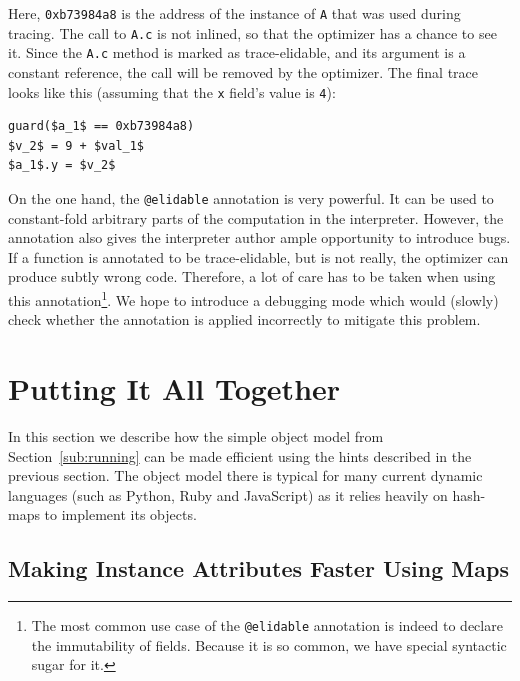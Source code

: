\documentclass[preprint]{sigplanconf}
\newcommand{\noop}{}
\begin{document}
Here, \texttt{0xb73984a8} is the address of the instance of \texttt{A} that was used
during tracing. The call to \texttt{A.c} is not inlined, so that the optimizer
has a chance to see it. Since the \texttt{A.c} method is marked as trace-elidable, and its
argument
is a constant reference, the call will be removed by the optimizer. The final
trace looks like this (assuming that the \texttt{x} field's value is \texttt{4}):
%
{\noop
\begin{lstlisting}[mathescape,basicstyle=\ttfamily]
guard($a_1$ == 0xb73984a8)
$v_2$ = 9 + $val_1$
$a_1$.y = $v_2$
\end{lstlisting}
}

On the one hand, the \texttt{@elidable} annotation is very powerful. It can be
used to constant-fold arbitrary parts of the computation in the interpreter.
However, the annotation also gives the interpreter author ample opportunity to introduce bugs. If a
function is annotated to be trace-elidable, but is not really, the optimizer can produce
subtly wrong code. Therefore, a lot of care has to be taken when using this
annotation\footnote{The most common use case of the \texttt{@elidable}
annotation is indeed to declare the immutability of fields. Because it is so
common, we have special syntactic sugar for it.}. We hope to introduce a
debugging mode which would (slowly) check whether the annotation is applied
incorrectly to mitigate this problem.



\section{Putting It All Together}
\label{sec:fastobjmodel}

In this section we describe how the simple object model from
Section~\ref{sub:running} can be made efficient using the hints described in the
previous section. The object model there is typical for many current
dynamic languages (such as Python, Ruby and JavaScript) as it relies heavily on
hash-maps to implement its objects.


\subsection{Making Instance Attributes Faster Using Maps}
\end{document}
